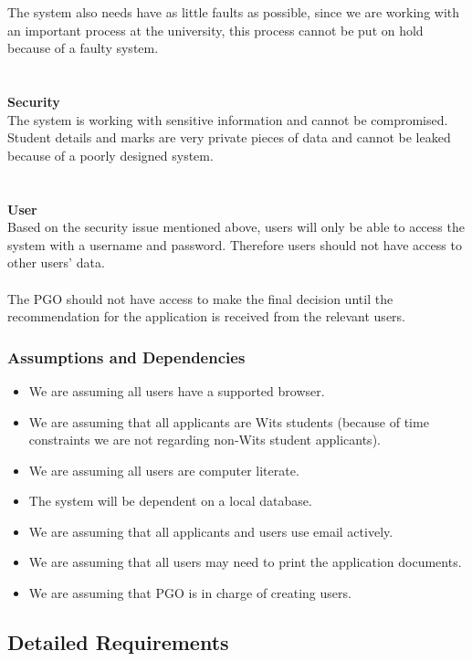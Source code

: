 \documentclass{article}
\begin{document}
The system also needs have as little faults as possible, since we are working with an important process at the university, this process cannot be put on hold because of a faulty system. \\ \\ \\
\textbf{Security} \\
The system is working with sensitive information and cannot be compromised. Student details and marks are very private pieces of data and cannot be leaked because of a poorly designed system. \\ \\ \\
\textbf{User} \\
Based on the security issue mentioned above, users will only be able to access the system with a username and password. Therefore users should not have access to other users' data. \\ \\
The PGO should not have access to make the final decision until the recommendation for the application is received from the relevant users. \\ 
\subsubsection{Assumptions and Dependencies}
\begin{itemize}
\item We are assuming all users have a supported browser.
\item We are assuming that all applicants are Wits students (because of time constraints we are not regarding non-Wits student applicants).
\item We are assuming all users are computer literate. 
\item The system will be dependent on a local database.
\item We are assuming that all applicants and users use email actively.
\item We are assuming that all users may need to print the application documents.
\item We are assuming that PGO is in charge of creating users.
\end{itemize}
\subsection{Detailed Requirements}
\end{document}
